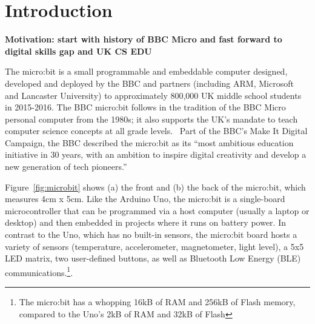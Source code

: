 \section{Introduction}
\label{sec:intrp}



{\bf Motivation: start with history of BBC Micro and fast forward to digital skills
gap and UK CS EDU}




The micro:bit is a small programmable and embeddable computer designed, 
developed and deployed by the BBC and partners (including ARM, Microsoft
and Lancaster University) to approximately 800,000 UK middle school students
in 2015-2016. The BBC micro:bit follows in the tradition of the BBC Micro personal
computer from the 1980s; it also supports the UK's mandate to 
teach computer science concepts at all grade levels.~\cite{PeytonJones2013ICFP}
Part of the BBC's Make It Digital Campaign, the BBC described the
micro:bit as its ``most ambitious education initiative in 30 years, 
with an ambition to inspire digital creativity and 
develop a new generation of tech pioneers.''~\cite{BBCwebsite}


Figure~\ref{fig:microbit} shows (a) the front and (b) the back of the
micro:bit, which measures 4cm x 5cm. Like the Arduino Uno, 
the micro:bit is a single-board microcontroller 
that can be programmed via a host computer (usually a laptop or desktop)
and then embedded in projects where it runs on battery power.
In contrast to the Uno, which has no built-in sensors, the micro:bit 
board hosts a variety of sensors (temperature, accelerometer, magnetometer, 
light level), 
a 5x5 LED matrix, two user-defined buttons, as well as Bluetooth
Low Energy (BLE) communications.\footnote{The micro:bit has a whopping
16kB of RAM and 256kB of Flash memory, compared to the Uno's 2kB of 
RAM and 32kB of Flash}.

